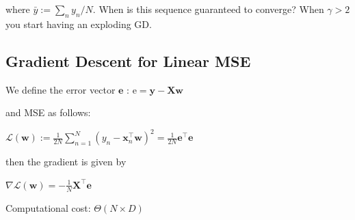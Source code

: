 where $\bar{y}:=\sum_{n} y_{n} / N$. When is this sequence guaranteed to converge? When $\gamma>2$ you start having an exploding GD.

\subsection*{Gradient Descent for Linear MSE}


We define the error vector $\mathbf{e}$ :
$\mathrm{e}=\mathbf{y}-\mathbf{X w}$

and MSE as follows:

$
\mathcal{L}(\mathbf{w}) :=\frac{1}{2 N} \sum_{n=1}^{N}\left(y_{n}-\mathbf{x}_{n}^{\top} \mathbf{w}\right)^{2} =\frac{1}{2 N} \mathbf{e}^{\top} \mathbf{e}
$

then the gradient is given by

$\nabla \mathcal{L}(\mathbf{w})=-\frac{1}{N} \mathbf{X}^{\top} \mathbf{e}$

Computational cost: $\Theta(N\times D)$



